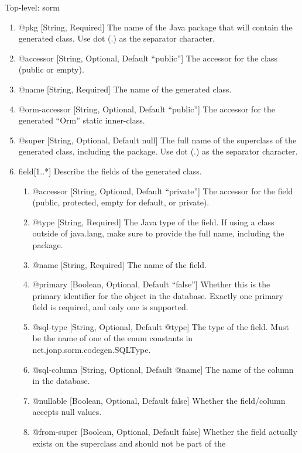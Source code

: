 \documentclass{book}
\begin{document}
Top-level: sorm
\begin{enumerate}
    \item @pkg [String, Required] The name of the Java package that will contain
          the generated class. Use dot (.) as the separator character.
    \item @accessor [String, Optional, Default ``public''] The accessor for the
          class (public or empty).
    \item @name [String, Required] The name of the generated class.
    \item @orm-accessor [String, Optional, Default ``public''] The accessor for
          the generated ``Orm'' static inner-class.
    \item @super [String, Optional, Default null] The full name of the
          superclass of the generated class, including the package. Use dot (.)
          as the separator character.
    \item field[1..*] Describe the fields of the generated class.
    \begin{enumerate}
        \item @accessor [String, Optional, Default ``private''] The accessor for
              the field (public, protected, empty for default, or private).
        \item @type [String, Required] The Java type of the field. If using a
              class outside of java.lang, make sure to provide the full name,
              including the package.
        \item @name [String, Required] The name of the field.
        \item @primary [Boolean, Optional, Default ``false''] Whether this is
              the primary identifier for the object in the database. Exactly one
              primary field is required, and only one is supported.
        \item @sql-type [String, Optional, Default @type] The type of the field.
              Must be the name of one of the enum constants in
              net.jonp.sorm.codegen.SQLType.
        \item @sql-column [String, Optional, Default @name] The name of the
              column in the database.
        \item @nullable [Boolean, Optional, Default false] Whether the
              field/column accepts null values.
        \item @from-super [Boolean, Optional, Default false] Whether the field
              actually exists on the superclass and should not be part of the

\end{enumerate}
\end{enumerate}
\end{document}

